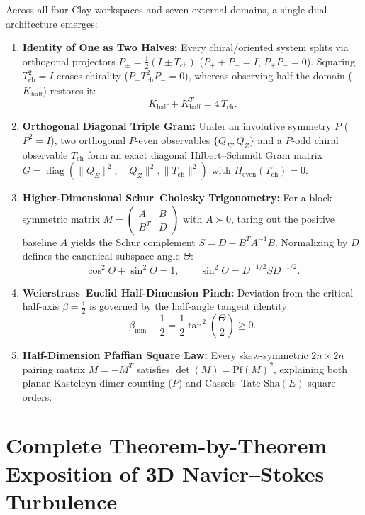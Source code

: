 \documentclass[11pt,a4paper]{article}
\providecommand{\Sha}{\mathrm{Sha}}
\begin{document}
Across all four Clay workspaces and seven external domains, a single dual architecture emerges:
\begin{enumerate}
  \item \textbf{Identity of One as Two Halves:} Every chiral/oriented system splits via orthogonal projectors $P_\pm = \frac{1}{2}(I \pm T_{\mathrm{ch}})$ ($P_+ + P_- = I$, $P_+ P_- = 0$). Squaring $T_{\mathrm{ch}}^2 = I$ erases chirality ($P_+ T_{\mathrm{ch}}^2 P_- = 0$), whereas observing half the domain ($K_{\mathrm{half}}$) restores it:
  \[
    K_{\mathrm{half}} + K_{\mathrm{half}}^T = 4\,T_{\mathrm{ch}}.
  \]
  \item \textbf{Orthogonal Diagonal Triple Gram:} Under an involutive symmetry $P$ ($P^2=I$), two orthogonal $P$-even observables $\{Q_E, Q_Z\}$ and a $P$-odd chiral observable $T_{\mathrm{ch}}$ form an exact diagonal Hilbert--Schmidt Gram matrix $G = \operatorname{diag}(\|Q_E\|^2, \|Q_Z\|^2, \|T_{\mathrm{ch}}\|^2)$ with $\Pi_{\mathrm{even}}(T_{\mathrm{ch}}) = 0$.
  \item \textbf{Higher-Dimensional Schur--Cholesky Trigonometry:} For a block-symmetric matrix $M = \begin{pmatrix} A & B \\ B^T & D \end{pmatrix}$ with $A \succ 0$, taring out the positive baseline $A$ yields the Schur complement $S = D - B^T A^{-1} B$. Normalizing by $D$ defines the canonical subspace angle $\Theta$:
  \[
    \cos^2\Theta + \sin^2\Theta = 1, \qquad \sin^2\Theta = D^{-1/2} S D^{-1/2}.
  \]
  \item \textbf{Weierstrass--Euclid Half-Dimension Pinch:} Deviation from the critical half-axis $\beta = \frac{1}{2}$ is governed by the half-angle tangent identity
  \[
    \beta_{\min} - \frac{1}{2} = \frac{1}{2}\tan^2\!\left(\frac{\Theta}{2}\right) \ge 0.
  \]
  \item \textbf{Half-Dimension Pfaffian Square Law:} Every skew-symmetric $2n\times 2n$ pairing matrix $M = -M^T$ satisfies $\det(M) = \mathrm{Pf}(M)^2$, explaining both planar Kasteleyn dimer counting ($P$) and Cassels--Tate $\Sha(E)$ square orders.
\end{enumerate}

\section{Complete Theorem-by-Theorem Exposition of 3D Navier--Stokes Turbulence}
\end{document}
